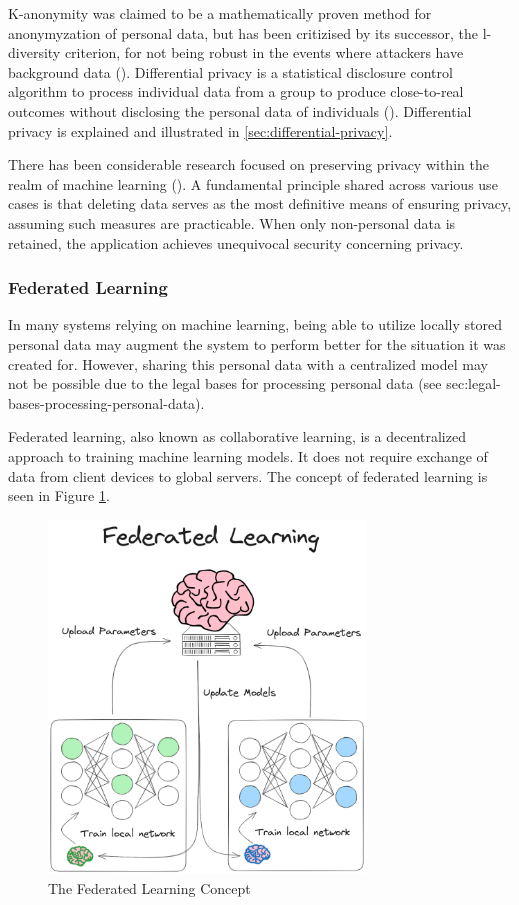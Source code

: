 K-anonymity was claimed to be a mathematically proven method for anonymyzation of personal data, but has been critizised by its successor, the l-diversity criterion, for not being robust in the events where attackers have background data (\cite{ma2007l-diversity}). Differential privacy is a statistical disclosure control algorithm to process individual data from a group to produce close-to-real outcomes without disclosing the personal data of individuals (\cite{hu2023metaverse-privacy}). Differential privacy is explained and illustrated in \ref{sec:differential-privacy}.

There has been considerable research focused on preserving privacy within the realm of machine learning (\cite{ra2023visual_privacy_techniques}). A fundamental principle shared across various use cases is that deleting data serves as the most definitive means of ensuring privacy, assuming such measures are practicable. When only non-personal data is retained, the application achieves unequivocal security concerning privacy.

\subsubsection{Federated Learning}
\label{sec:federated_learning}
In many systems relying on machine learning, being able to utilize locally stored personal data may augment the system to perform better for the situation it was created for. However, sharing this personal data with a centralized model may not be possible due to the legal bases for processing personal data (see sec:legal-bases-processing-personal-data).

Federated learning, also known as collaborative learning, is a decentralized approach to training machine learning models. It does not require exchange of data from client devices to global servers. The concept of federated learning is seen in Figure \ref{fig:federatedlearning}. 

\begin{figure}[H]
    \centering
    \includegraphics[width=0.75\textwidth]{Images/Diagrams/FL_updated.png}
    \caption{\centering The Federated Learning Concept}
    \label{fig:federatedlearning}
\end{figure}

